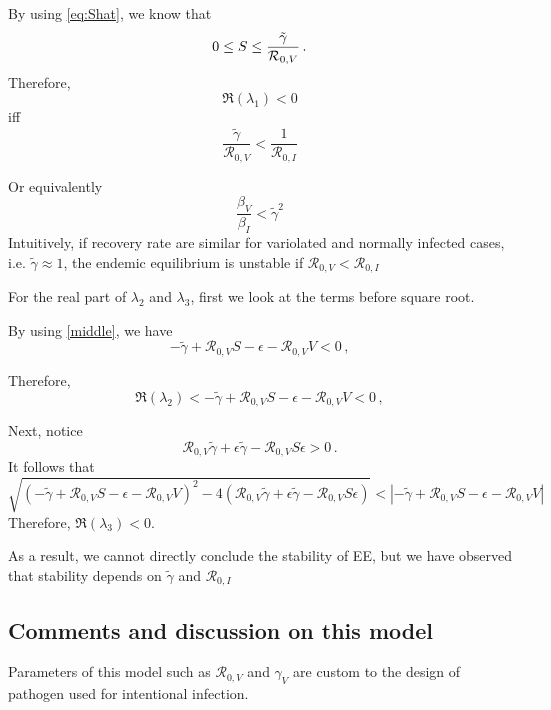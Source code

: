 \documentclass[12pt]{article}
\newcommand{\R}{\mathcal{R}}
\begin{document}
By using \autoref{eq:Shat}, we know that
\begin{equation}
0\leq S\leq \frac{\tilde{\gamma}}{\R_{0,V}}\,.{\label{middle}}
\end{equation}
Therefore, 
\begin{equation}
\Re(\lambda_1) <0
\end{equation}
iff 
\begin{equation}
\frac{\tilde{\gamma}}{\R_{0,V}}<\frac{1}{\R_{0,I}}
\end{equation}

Or equivalently 
\begin{equation}
\frac{\beta_V}{\beta_I}<\tilde{\gamma}^2
\end{equation}
Intuitively, if recovery rate are similar for variolated and normally infected cases, i.e. $\tilde{\gamma}\approx 1$, the endemic equilibrium is unstable if $\R_{0,V}<\R_{0,I}$

For the real part of $\lambda_2$ and $\lambda_3$, first we look at the terms before square root. 

By using \autoref{middle}, we have
\begin{equation}
-\tilde{\gamma}+\R_{0,V}S-\epsilon-\R_{0,V}V<0\,,
\end{equation}

Therefore,
\begin{equation}
\Re(\lambda_2)<-\tilde{\gamma}+\R_{0,V}S-\epsilon-\R_{0,V}V<0\,,
\end{equation}

Next, notice
\begin{equation}
\R_{0,V}\tilde{\gamma}+\epsilon\tilde{\gamma}-\R_{0,V}S\epsilon>0\,.
\end{equation}
It follows that
\begin{equation}
\sqrt{(-\tilde{\gamma}+\R_{0,V} S-\epsilon-\R_{0,V}V)^2-4(\R_{0,V}\tilde{\gamma}+\epsilon\tilde{\gamma}-\R_{0,V}S\epsilon)}<|-\tilde{\gamma}+\R_{0,V} S-\epsilon-\R_{0,V}V|
\end{equation}
Therefore, $\Re(\lambda_3)<0$.

As a result, we cannot directly conclude the stability of EE, but we have observed that stability depends on $\tilde{\gamma}$ and $\R_{0,I}$

\subsection{Comments and discussion on this model}

Parameters of this model such as $\R_{0,V}$ and $\gamma_V$ are custom to the design of pathogen used for intentional infection. 
\end{document}
